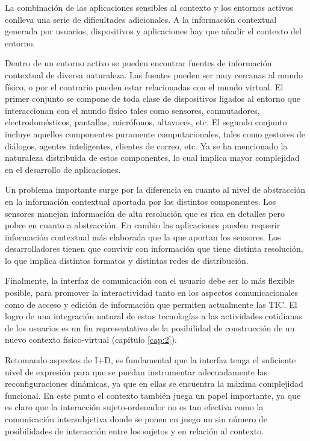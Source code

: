 La combinación de las aplicaciones sensibles al contexto y los entornos activos
conlleva una serie de dificultades adicionales. A la información contextual
generada por usuarios, dispositivos y aplicaciones hay que añadir el contexto
del entorno.

Dentro de un entorno activo se pueden encontrar fuentes de información
contextual de diversa naturaleza. Las fuentes pueden ser muy cercanas al mundo
físico, o por el contrario pueden estar relacionadas con el mundo virtual. El
primer conjunto se compone de toda clase de dispositivos ligados al entorno que
interaccionan con el mundo físico tales como sensores, conmutadores,
electrodomésticos, pantallas, micrófonos, altavoces, etc. El segundo conjunto
incluye aquellos componentes puramente computacionales, tales como gestores de
diálogos, agentes inteligentes, clientes de correo, etc. Ya se ha mencionado la
naturaleza distribuida de estos componentes, lo cual implica mayor complejidad
en el desarrollo de aplicaciones.

Un problema importante surge por la diferencia en cuanto al nivel de abstracción
en la información contextual aportada por los distintos componentes. Los
sensores manejan información de alta resolución que es rica en detalles pero
pobre en cuanto a abstracción. En cambio las aplicaciones pueden requerir
información contextual más elaborada que la que aportan los sensores. Los
desarrolladores tienen que convivir con información que tiene distinta
resolución, lo que implica distintos formatos y distintas redes de
distribución.

Finalmente, la interfaz de comunicación con el usuario debe ser lo más flexible
posible, para promover la interactividad tanto en los aspectos
comunicacionales como de acceso y edición de información que permiten
actualmente las TIC. El logro de una integración natural de estas tecnologías a
las actividades cotidianas de los usuarios es un fin representativo de la
posibilidad de  construcción de un nuevo contexto físico-virtual (capítulo
\ref{cap:2}).

Retomando aspectos de I+D, es fundamental que la interfaz tenga el suficiente nivel
de expresión para que se puedan instrumentar adecuadamente las reconfiguraciones
dinámicas, ya que en ellas se encuentra la máxima complejidad
funcional. En este punto el contexto también juega un papel importante, ya que es claro que la
interacción sujeto-ordenador no es tan efectiva como la comunicación
intersubjetiva donde se ponen en juego un sin número de posibilidades de
interacción entre los sujetos y en relación al contexto. 

